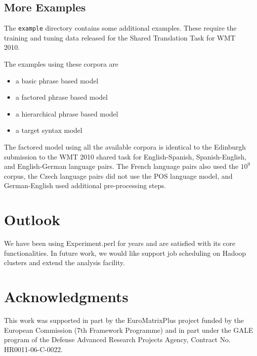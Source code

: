 \documentclass{pbml}
\begin{document}
\subsection{More Examples}


The {\tt example} directory contains some additional examples. 
These require the training and tuning data released for the Shared Translation Task for WMT 2010.

The examples using these corpora are

\begin{itemize}
\item a basic phrase based model

\item a factored phrase based model

\item a hierarchical phrase based model

\item a target syntax model

\end{itemize}


The factored model using all the available corpora is identical to the Edinburgh submission \citep{koehn-EtAl:2010:WMT} to the WMT 2010 shared task for English-Spanish, Spanish-English, and English-German language pairs. The French language pairs also used the $\text{10}^\text{9}$ corpus, the Czech language pairs did not use the POS language model, and German-English used additional pre-processing steps.

\section{Outlook}
We have been using Experiment.perl for years and are satisfied with its core functionalities. In future work, we would like support job scheduling on Hadoop clusters and extend the analysis facility.

\section*{Acknowledgments}
This work was supported in part by the EuroMatrixPlus project funded by the 
 European Commission (7th Framework Programme) and in part under the GALE program of the 
 Defense Advanced Research Projects Agency, Contract No. HR0011-06-C-0022.


\end{document}

